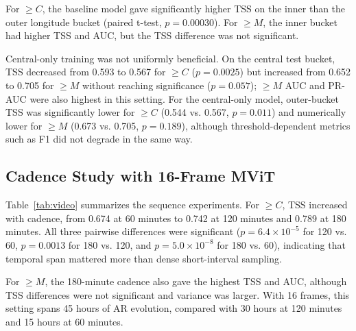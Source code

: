 \documentclass[runningheads]{llncs}
\begin{document}
For $\geq C$, the baseline model gave significantly higher TSS on the inner than the outer longitude bucket (paired t-test, $p=0.00030$). For $\geq M$, the inner bucket had higher TSS and AUC, but the TSS difference was not significant.

Central-only training was not uniformly beneficial. On the central test bucket, TSS decreased from 0.593 to 0.567 for $\geq C$ ($p=0.0025$) but increased from 0.652 to 0.705 for $\geq M$ without reaching significance ($p=0.057$); $\geq M$ AUC and PR-AUC were also highest in this setting. For the central-only model, outer-bucket TSS was significantly lower for $\geq C$ (0.544 vs. 0.567, $p=0.011$) and numerically lower for $\geq M$ (0.673 vs. 0.705, $p=0.189$), although threshold-dependent metrics such as F1 did not degrade in the same way.




\subsection{Cadence Study with 16-Frame MViT}

Table~\ref{tab:video} summarizes the sequence experiments. For $\geq C$, TSS increased with cadence, from 0.674 at 60 minutes to 0.742 at 120 minutes and 0.789 at 180 minutes. All three pairwise differences were significant ($p=6.4\times10^{-5}$ for 120 vs. 60, $p=0.0013$ for 180 vs. 120, and $p=5.0\times10^{-8}$ for 180 vs. 60), indicating that temporal span mattered more than dense short-interval sampling.


For $\geq M$, the 180-minute cadence also gave the highest TSS and AUC, although TSS differences were not significant and variance was larger. With 16 frames, this setting spans 45 hours of AR evolution, compared with 30 hours at 120 minutes and 15 hours at 60 minutes.
\end{document}
